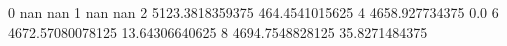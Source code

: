 0 nan nan
1 nan nan
2 5123.3818359375 464.4541015625
4 4658.927734375 0.0
6 4672.57080078125 13.64306640625
8 4694.7548828125 35.8271484375
